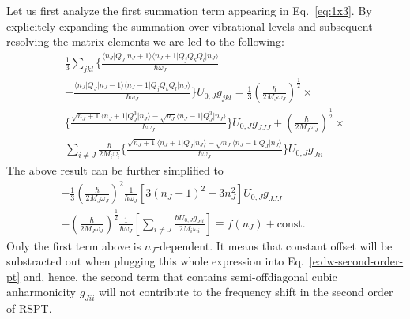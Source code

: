 \documentclass[a4paper,titlepage,twoside,fleqn,12pt]{book}
\begin{document}
\begin{refsection}
Let us first analyze the first summation term appearing in Eq.~\eqref{eq:1x3}.
By explicitely expanding the summation over vibrational levels and subsequent resolving
the matrix elements we are led to the following:
%
\begin{multline}
\frac{1}{3}  \sum_{jkl}
  \Bigg\{ 
   \frac{\langle n_J \vert Q_J \vert n_J+1 \rangle 
         \langle n_J+1 \vert Q_jQ_kQ_l \vert n_J \rangle}{\hbar \omega_J} \\
 - \frac{\langle n_J \vert Q_J \vert n_J-1 \rangle
         \langle n_J-1 \vert Q_jQ_kQ_l \vert n_J \rangle}{\hbar \omega_J}
  \Bigg\}     U_{0,J} g_{jkl} 
= 
\frac{1}{3} \left( \frac{\hbar}{2M_J\omega_J} \right)^\frac{1}{2} \times \\
  \Bigg\{
    \frac{\sqrt{n_J+1}\langle n_J+1 \vert Q_J^3 \vert n_J \rangle - \sqrt{n_J} 
         \langle n_J-1 \vert Q_J^3 \vert n_J \rangle}{\hbar\omega_J} 
  \Bigg\} U_{0,J} g_{JJJ} + \left( \frac{\hbar}{2M_J\omega_J} \right)^\frac{1}{2} \times \\
\sum_{i\ne J} \frac{\hbar}{2M_i\omega_i}
  \Bigg\{
     \frac{\sqrt{n_J+1}\langle n_J+1 \vert Q_J \vert n_J \rangle - \sqrt{n_J}
          \langle n_J-1 \vert Q_J \vert n_J \rangle}{\hbar\omega_J}
  \Bigg\} U_{0,J} g_{Jii}
\end{multline}
%
The above result can be further simplified to
%
\begin{multline}    \label{e:x552}
-\frac{1}{3} \left( \frac{\hbar}{2M_J\omega_J} \right)^2 \frac{1}{\hbar\omega_J} 
           \left[ 3\left( n_J+1 \right)^2 - 3n_J^2 \right] U_{0,J} g_{JJJ} \\ - 
     \left( \frac{\hbar}{2M_J\omega_J} \right)^\frac{1}{2} \frac{1}{\hbar\omega_J}
     \left[ \sum_{i\ne J} \frac{\hbar U_{0,J} g_{Jii}}{2M_i\omega_i} \right]  \equiv 
f(n_J) + \mathrm{const.} \qquad \qquad
\end{multline}
%
Only the first term above is $n_J$-dependent. It means that constant offset will be 
substracted out when plugging this whole expression into Eq.~\eqref{e:dw-second-order-pt}
and, hence, the second term that contains semi-offdiagonal cubic anharmonicity $g_{Jii}$ 
will not contribute to the frequency shift in the second order of RSPT.


\end{refsection}
\end{document}
